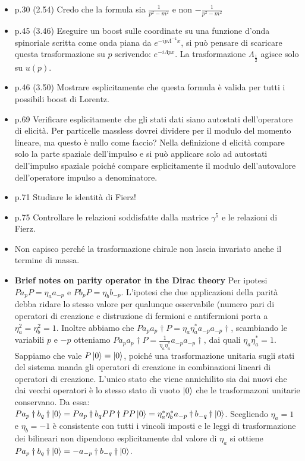 \documentclass[10pt,a4paper]{article}
\begin{document}
\begin{itemize}
\item p.30 (2.54) Credo che la formula sia $\frac{1}{p^2-m^2}$ e non $-\frac{1}{p^2-m^2}$

\item p.45 (3.46) Eseguire un boost sulle coordinate su una funzione d'onda spinoriale scritta come onda piana da $e^{-i p \Lambda^{-1} x}$, si può pensare di scaricare questa trasformazione su $p$ scrivendo: $e^{-i \Lambda p x}$. La trasformazione $\Lambda_{\frac{1}{2}}$ agisce solo su $u(p)$.

\item p.46 (3.50) Mostrare esplicitamente che questa formula è valida per tutti i possibili boost di Lorentz.

\item p.69 Verificare esplicitamente che gli stati dati siano autostati dell'operatore di elicità. Per particelle massless dovrei dividere per il modulo del momento lineare, ma questo è nullo come faccio? Nella definizione d elicità compare solo la parte spaziale dell'impulso e si può applicare solo ad autostati dell'impulso spaziale poiché compare esplicitamente il modulo dell'autovalore dell'operatore impulso a denominatore. 

\item p.71 Studiare le identità di Fierz!

\item p.75 Controllare le relazioni soddisfatte dalla matrice $\gamma^{5}$ e le relazioni di Fierz.
\item Non capisco perché la trasformazione chirale non lascia invariato anche il termine di massa.

\item \textbf{Brief notes on parity operator in the Dirac theory}
Per ipotesi $P a_{p} P = \eta_{a} a_{-p}$ e $P b_{p} P = \eta_{b} b_{-p}$. 
L'ipotesi che due applicazioni della parità debba ridare lo stesso valore per qualunque osservabile (numero pari di operatori di creazione e distruzione di fermioni e antifermioni porta a $\eta_{a}^2 = \eta_{b}^2 = 1$. 
Inoltre abbiamo che $P a_{p} a_{p} \dagger P = \eta_{a} \eta_{a}^{*} a_{-p} a_{-p} \dagger$, scambiando le variabili $p$ e $-p$ otteniamo $P a_{p} a_{p} \dagger P = \frac{1}{\eta_{a} \eta_{a}^{*}} a_{-p} a_{-p} \dagger$, dai quali $\eta_{a} \eta_{a}^{*} = 1$. 
Sappiamo che vale $P \ket{0} = \ket{0}$, poiché una trasformazione unitaria sugli stati del sistema manda gli operatori di creazione in combinazioni lineari di operatori di creazione.
 L'unico stato che viene annichilito sia dai nuovi che dai vecchi operatori è lo stesso stato di vuoto $\ket{0}$ che le trasformazoni unitarie conservano. 
 Da essa: $P a_{p} \dagger b_{q} \dagger \ket{0} = P a_{p} \dagger b_{q} PP \dagger PP \ket{0} = \eta_{a}^{*} \eta_{b}^{*} a_{-p} \dagger  b_{-q} \dagger \ket{0}$. 
Scegliendo $\eta_{a} = 1$ e $\eta_{b} = -1$ è consistente con tutti i vincoli imposti e le leggi di trasformazione dei bilineari non dipendono esplicitamente dal valore di $\eta_{a}$ si ottiene $P a_{p} \dagger b_{q} \dagger \ket{0} = -a_{-p} \dagger  b_{-q} \dagger \ket{0}$.


\end{itemize}
\end{document}
